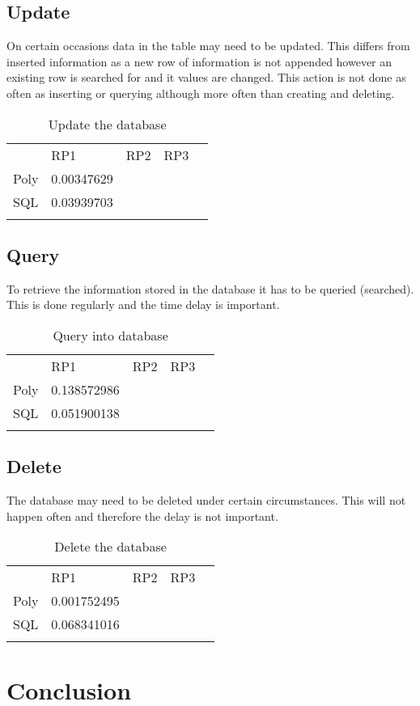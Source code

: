 \subsection{Update}
On certain occasions data in the table may need to be updated. This differs from inserted information as a new row of information is not appended however an existing row is searched for and it values are changed. This action is not done as often as inserting or querying although more often than creating and deleting.
\begin{table}[!htb]
\centering
\caption{Update the database}
\label{Update}
\begin{tabular}{lllll}
     & RP1         & RP2 & RP3 &  \\
Poly & 0.00347629 &     &     &  \\
SQL  & 0.03939703 &     &     &  \\
     &             &     &     & 
\end{tabular}
\end{table}

\subsection{Query}
To retrieve the information stored in the database it has to be queried (searched). This is done regularly and the time delay is important.
\begin{table}[!htb]
\centering
\caption{Query into database}
\label{Query}
\begin{tabular}{lllll}
     & RP1         & RP2 & RP3 &  \\
Poly & 0.138572986 &     &     &  \\
SQL  & 0.051900138 &     &     &  \\
     &             &     &     & 
\end{tabular}
\end{table}

\subsection{Delete}
The database may need to be deleted under certain circumstances. This will not happen often and therefore the delay is not important.
\begin{table}[!htb]
\centering
\caption{Delete the database}
\label{Delete}
\begin{tabular}{lllll}
     & RP1         & RP2 & RP3 &  \\
Poly & 0.001752495 &     &     &  \\
SQL  & 0.068341016 &     &     &  \\
     &             &     &     & 
\end{tabular}
\end{table}

\section{Conclusion}

\iffalse
The chosen RPi we are using is ...
For this RPi this bar graph which seperate bar for each operation and shaded for sql and unshaded for poly.
\fi